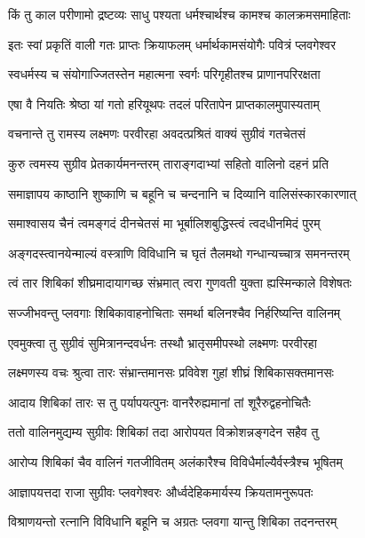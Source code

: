 \twolineshloka
{किं तु काल परीणामो द्रष्टव्यः साधु पश्यता}
{धर्मश्चार्थश्च कामश्च कालक्रमसमाहिताः} %

\twolineshloka
{इतः स्वां प्रकृतिं वाली गतः प्राप्तः क्रियाफलम्}
{धर्मार्थकामसंयोगैः पवित्रं प्लवगेश्वर} %

\twolineshloka
{स्वधर्मस्य च संयोगाज्जितस्तेन महात्मना}
{स्वर्गः परिगृहीतश्च प्राणानपरिरक्षता} %

\twolineshloka
{एषा वै नियतिः श्रेष्ठा यां गतो हरियूथपः}
{तदलं परितापेन प्राप्तकालमुपास्यताम्} %

\twolineshloka
{वचनान्ते तु रामस्य लक्ष्मणः परवीरहा}
{अवदत्प्रश्रितं वाक्यं सुग्रीवं गतचेतसं} %

\twolineshloka
{कुरु त्वमस्य सुग्रीव प्रेतकार्यमनन्तरम्}
{ताराङ्गदाभ्यां सहितो वालिनो दहनं प्रति} %

\twolineshloka
{समाज्ञापय काष्ठानि शुष्काणि च बहूनि च}
{चन्दनानि च दिव्यानि वालिसंस्कारकारणात्} %

\twolineshloka
{समाश्वासय चैनं त्वमङ्गदं दीनचेतसं}
{मा भूर्बालिशबुद्धिस्त्वं त्वदधीनमिदं पुरम्} %

\twolineshloka
{अङ्गदस्त्वानयेन्माल्यं वस्त्राणि विविधानि च}
{घृतं तैलमथो गन्धान्यच्चात्र समनन्तरम्} %

\twolineshloka
{त्वं तार शिबिकां शीघ्रमादायागच्छ संभ्रमात्}
{त्वरा गुणवती युक्ता ह्यस्मिन्काले विशेषतः} %

\twolineshloka
{सज्जीभवन्तु प्लवगाः शिबिकावाहनोचिताः}
{समर्था बलिनश्चैव निर्हरिष्यन्ति वालिनम्} %

\twolineshloka
{एवमुक्त्वा तु सुग्रीवं सुमित्रानन्दवर्धनः}
{तस्थौ भ्रातृसमीपस्थो लक्ष्मणः परवीरहा} %

\twolineshloka
{लक्ष्मणस्य वचः श्रुत्वा तारः संभ्रान्तमानसः}
{प्रविवेश गुहां शीघ्रं शिबिकासक्तमानसः} %

\twolineshloka
{आदाय शिबिकां तारः स तु पर्यापयत्पुनः}
{वानरैरुह्यमानां तां शूरैरुद्वहनोचितैः} %

\twolineshloka
{ततो वालिनमुद्यम्य सुग्रीवः शिबिकां तदा}
{आरोपयत विक्रोशन्नङ्गदेन सहैव तु} %

\twolineshloka
{आरोप्य शिबिकां चैव वालिनं गतजीवितम्}
{अलंकारैश्च विविधैर्माल्यैर्वस्त्रैश्च भूषितम्} %

\twolineshloka
{आज्ञापयत्तदा राजा सुग्रीवः प्लवगेश्वरः}
{और्ध्वदेहिकमार्यस्य क्रियतामनुरूपतः} %

\twolineshloka
{विश्राणयन्तो रत्नानि विविधानि बहूनि च}
{अग्रतः प्लवगा यान्तु शिबिका तदनन्तरम्} %

